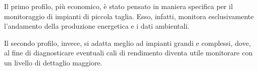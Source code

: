 %
Il primo profilo, pi\`u economico, \`e stato pensato in maniera specifica per il monitoraggio 
di impianti di piccola taglia. Esso, infatti, monitora esclusivamente l'andamento della produzione
energetica e i dati ambientali.
%

%
Il secondo profilo, invece, si adatta meglio ad impianti grandi e complessi, dove, al fine di 
diagnosticare eventuali cali di rendimento diventa utile monitorare con un livello di dettaglio
maggiore.
